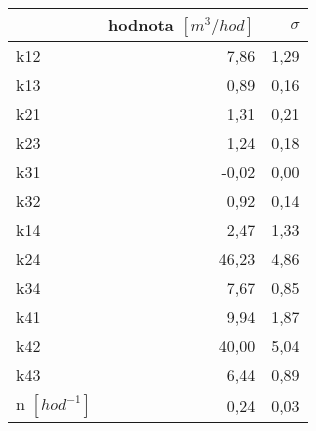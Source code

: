 \begin{tabular}{lrr}
\toprule
{} &  hodnota $\left[\si{m^3/hod}\right]$ &  $\sigma$ \\
\midrule
k12                 &                                 7,86 &      1,29 \\
k13                 &                                 0,89 &      0,16 \\
k21                 &                                 1,31 &      0,21 \\
k23                 &                                 1,24 &      0,18 \\
k31                 &                                -0,02 &      0,00 \\
k32                 &                                 0,92 &      0,14 \\
k14                 &                                 2,47 &      1,33 \\
k24                 &                                46,23 &      4,86 \\
k34                 &                                 7,67 &      0,85 \\
k41                 &                                 9,94 &      1,87 \\
k42                 &                                40,00 &      5,04 \\
k43                 &                                 6,44 &      0,89 \\
n $[\si{hod^{-1}}]$ &                                 0,24 &      0,03 \\
\bottomrule
\end{tabular}
